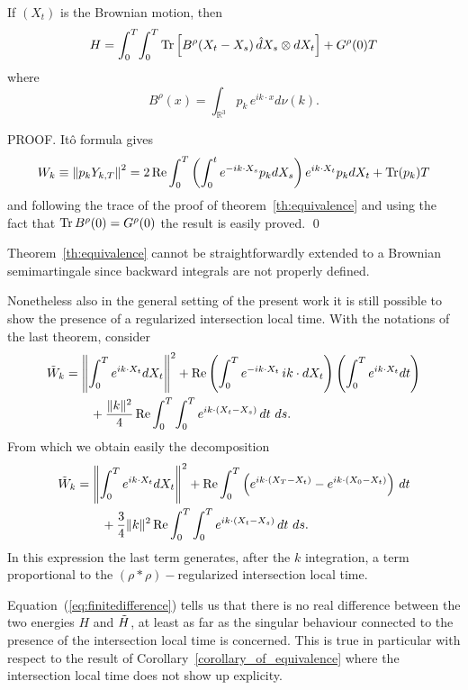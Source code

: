 \begin{corollary}
\label{corollary_of_equivalence}
If $(X_t)$ is the Brownian motion, then
\begin{equation}
\begin{split}
H & = \int_0^T \!\int_0^T  \operatorname{Tr} \left[B^\rho(X_t-X_s)\, \hat{d}X_s \otimes
 dX_t \right]+ 
   G^\rho(0) T   \\
\end{split}
\label{equivalence2}
\end{equation}
where
$$
B^\rho(x) = \int_{\mathbb{R}^3} p_k \,e^{ik \cdot x} d\nu(k). 
$$
\end{corollary}

PROOF. 
It\^o formula gives
\begin{equation*}
W_k  \equiv  \left\| p_k Y_{k,T} \right\|^2 
 =  
2 \operatorname{Re} \int_0^T \left( \int_0^t e^{-ik \cdot X_s} p_k dX_s \right) e^{ik \cdot X_t}
p_k dX_t + \operatorname{Tr} (p_k) T
\end{equation*}
and following the trace of the proof of theorem~\ref{th:equivalence}
and using the fact that $\operatorname{Tr} B^\rho(0) = G^\rho(0)$ the
result is easily proved.
\qed

\begin{remark}
Theorem~\ref{th:equivalence} cannot be straightforwardly extended to a Brownian
semimartingale since backward integrals are not properly defined. 

Nonetheless also in the general setting of the present work it is still
possible to show the presence of a regularized intersection local time.
With the notations of the last theorem, consider
\begin{equation*}
\begin{split}
\Tilde{W}_k & = \left\| \int_0^T e^{ik\cdot X_t} dX_t \right\|^2
+  \operatorname{Re} \left(\int_0^T e^{-ik\cdot X_t}\, ik \cdot dX_t\right) \left(\int_0^T
  e^{ik\cdot X_t} dt\right) \\
& \qquad + \frac{\|k\|^2}{4} \operatorname{Re} \int_0^T \int_0^T e^{ik\cdot (X_t-X_s)}\, dt~ds. 
\end{split}
\end{equation*}
From which we obtain easily the decomposition
\begin{equation*}
\begin{split}
\Tilde{W}_k & = \left\| \int_0^T e^{ik\cdot X_t} dX_t \right\|^2
+  \operatorname{Re} \int_0^T \left( e^{ik\cdot (X_T-X_t)}-e^{ik\cdot (X_0-X_t)}\right)\, 
 dt \\
& \qquad + \frac{3 }{4} \|k\|^2 \operatorname{Re} \int_0^T \int_0^T e^{ik\cdot (X_t-X_s)}\, dt~ds. 
\end{split}
\end{equation*}
In this expression the last term generates, after the $k$ integration, a term
proportional to the $(\rho*\rho)-$regularized intersection local time. 

Equation~(\ref{eq:finitedifference}) tells us that there is no real
difference between the two energies $H$ and $\Tilde{H}$, at least as
far as the singular behaviour connected to the presence of the
intersection local time is concerned. This is true in particular with
respect to the result of Corollary~\ref{corollary_of_equivalence}
where the intersection local time does not show up explicity.
\end{remark}


